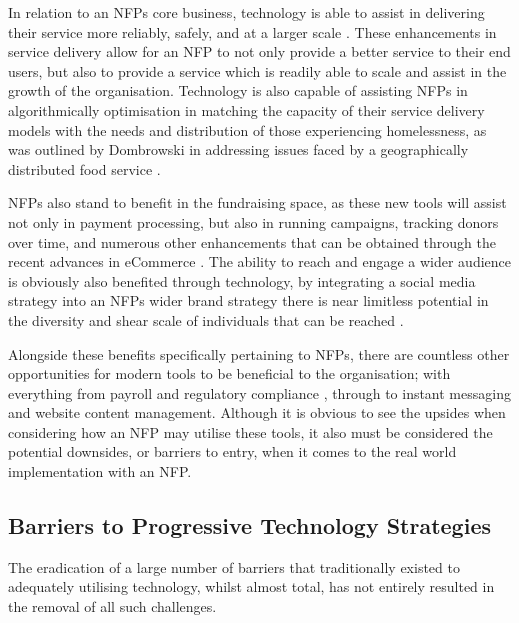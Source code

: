 In relation to an NFPs core business, technology is able to assist in delivering their service more reliably, safely, and at a larger scale \cite{boles2013technology}. These enhancements in service delivery allow for an NFP to not only provide a better service to their end users, but also to provide a service which is readily able to scale and assist in the growth of the organisation. Technology is also capable of assisting NFPs in algorithmically optimisation in matching the capacity of their service delivery models with the needs and distribution of those experiencing homelessness, as was outlined by Dombrowski in addressing issues faced by a geographically distributed food service \cite{dombrowski2013takes}.

NFPs also stand to benefit in the fundraising space, as these new tools will assist not only in payment processing, but also in running campaigns, tracking donors over time, and numerous other enhancements that can be obtained through the recent advances in eCommerce \cite{goecks2008charitable} \cite{boeder2002non}. The ability to reach and engage a wider audience is obviously also benefited through technology, by integrating a social media strategy into an NFPs wider brand strategy there is near limitless potential in the diversity and shear scale of individuals that can be reached \cite{lovejoy2012information} \cite{nah2013modeling} \cite{wyllie2016examination} \cite{milde2017strategies}.

Alongside these benefits specifically pertaining to NFPs, there are countless other opportunities for modern tools to be beneficial to the organisation; with everything from payroll and regulatory compliance \cite{mahajan2015review}, through to instant messaging and website content management. Although it is obvious to see the upsides when considering how an NFP may utilise these tools, it also must be considered the potential downsides, or barriers to entry, when it comes to the real world implementation with an NFP.

\subsection{Barriers to Progressive Technology Strategies}

The eradication of a large number of barriers that traditionally existed to adequately utilising technology, whilst almost total, has not entirely resulted in the removal of all such challenges.


